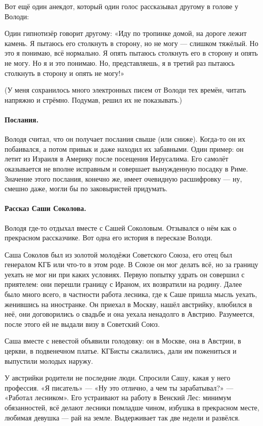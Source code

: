 \documentclass{book}
\begin{document}
Вот ещё один анекдот, который один голос рассказывал другому в голове у Володи:

Один гипнотизёр говорит другому:
«Иду по тропинке домой, на дороге лежит камень.
Я пытаюсь его столкнуть в сторону, но не могу --- слишком тяжёлый.
Но это я понимаю, всё нормально.
Я опять пытаюсь столкнуть его в сторону и опять не могу.
Но я и это понимаю.
Но, представляешь, я в третий раз пытаюсь столкнуть в сторону и опять  не могу!»

(У меня сохранилось много электронных писем от Володи тех времён, читать напряжно и стрёмно.
Подумав, решил их не показывать.)

\paragraph{Послания.}
Володя считал, что он получает послания свыше (или сниже).
Когда-то он их побаивался, а потом привык и даже находил их забавными.
Один пример: он летит из Израиля в Америку после посещения Иерусалима.
Его самолёт оказывается не вполне исправным и совершает вынужденную посадку в Риме.
Значение этого послания, конечно же, имеет очевидную расшифровку --- ну, смешно даже, могли бы
по заковыристей придумать.

\paragraph{Рассказ Саши Соколова.}
Володя где-то отдыхал вместе с Сашей Соколовым.
Отзывался о нём как о прекрасном рассказчике.
Вот одна его история в пересказе Володи.

Саша Соколов был из золотой молодёжи Советского Союза, его отец был генералом КГБ или что-то в этом роде.
В Союзе он мог делать всё, но за границу уехать не мог ни при каких условиях.
Первую попытку удрать он совершил с приятелем: они перешли границу с Ираном, их возвратили на родину.
Далее было много всего, в частности работа лесника, где к Саше пришла мысль уехать, женившись на иностранке.
Он приехал в Москву, нашёл австрийку, влюбился в неё, они договорились о свадьбе и она уехала ненадолго в Австрию.
Разумеется, после этого ей не выдали визу в Советский Союз.

Саша вместе с невестой объявили голодовку: он в Москве, она в Австрии, в церкви, в подвенечном платье.
КГБисты сжалились, дали им пожениться и выпустили молодых наружу.

У австрийки родители не последние люди.
Спросили Сашу, какая у него профессия.
«Я писатель» --- «Ну это отлично, а чем ты зарабатывал?» --- «Работал лесником».
Его устраивают на работу в Венский Лес: 
минимум обязанностей, 
всё делают лесники помладше чином, 
избушка в прекрасном месте, 
любимая девушка ---
рай на земле.
Выдерживает так две недели и развёлся.
\end{document}
